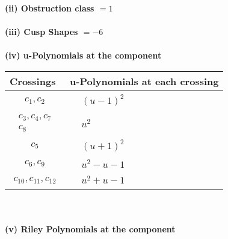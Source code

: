 \documentclass[1p]{elsarticle_modified}
\theoremstyle{definition}
\begin{document}
\flushleft \textbf{(ii) Obstruction class $= 1$}\\~\\
\flushleft \textbf{(iii) Cusp Shapes $= -6$}\\~\\
\newpage\renewcommand{\arraystretch}{1}
\flushleft \textbf{(iv) u-Polynomials at the component}\newline \\
\begin{tabular}{m{50pt}|m{274pt}}
Crossings & \hspace{64pt}u-Polynomials at each crossing \\
\hline $$\begin{aligned}c_{1},c_{2}\end{aligned}$$&$\begin{aligned}
&(u-1)^2
\end{aligned}$\\
\hline $$\begin{aligned}c_{3},c_{4},c_{7}\\c_{8}\end{aligned}$$&$\begin{aligned}
&u^2
\end{aligned}$\\
\hline $$\begin{aligned}c_{5}\end{aligned}$$&$\begin{aligned}
&(u+1)^2
\end{aligned}$\\
\hline $$\begin{aligned}c_{6},c_{9}\end{aligned}$$&$\begin{aligned}
&u^2- u-1
\end{aligned}$\\
\hline $$\begin{aligned}c_{10},c_{11},c_{12}\end{aligned}$$&$\begin{aligned}
&u^2+u-1
\end{aligned}$\\
\hline
\end{tabular}\\~\\
\newpage\renewcommand{\arraystretch}{1}
\flushleft \textbf{(v) Riley Polynomials at the component}\newline \\
\end{document}
